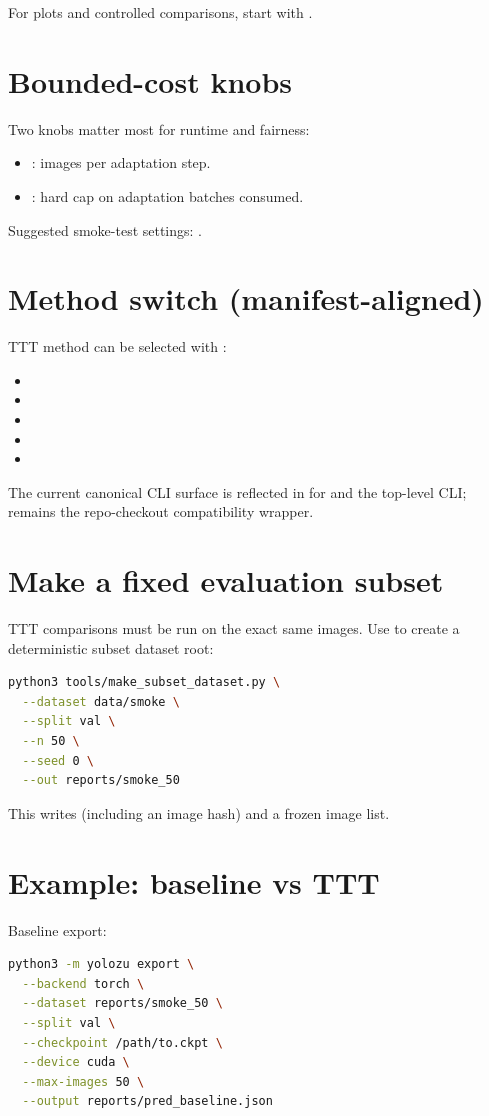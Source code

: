 For plots and controlled comparisons, start with .

\section{Bounded-cost knobs}
Two knobs matter most for runtime and fairness:
\begin{itemize}
  \item {}: images per adaptation step.
  \item {}: hard cap on adaptation batches consumed.
\end{itemize}

Suggested smoke-test settings:
.

\section{Method switch (manifest-aligned)}
TTT method can be selected with :
\begin{itemize}
  \item {}
  \item {}
  \item {}
  \item {}
  \item {}
\end{itemize}

The current canonical CLI surface is reflected in 
for  and the top-level  CLI;  remains the repo-checkout compatibility wrapper.

\section{Make a fixed evaluation subset}
TTT comparisons must be run on the exact same images.
Use  to create a deterministic subset dataset root:
\begin{lstlisting}[language=bash]
python3 tools/make_subset_dataset.py \
  --dataset data/smoke \
  --split val \
  --n 50 \
  --seed 0 \
  --out reports/smoke_50
\end{lstlisting}

This writes  (including an image hash) and a frozen image list.

\section{Example: baseline vs TTT}
Baseline export:
\begin{lstlisting}[language=bash]
python3 -m yolozu export \
  --backend torch \
  --dataset reports/smoke_50 \
  --split val \
  --checkpoint /path/to.ckpt \
  --device cuda \
  --max-images 50 \
  --output reports/pred_baseline.json
\end{lstlisting}

